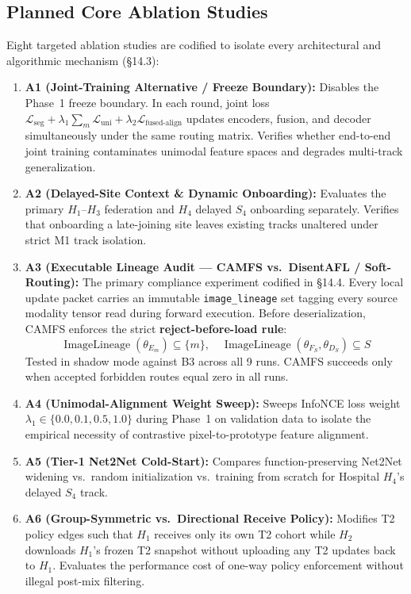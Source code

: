 \documentclass[10pt,a4paper]{article}
\begin{document}
\subsection{Planned Core Ablation Studies}
Eight targeted ablation studies are codified to isolate every architectural and algorithmic mechanism (\S14.3):
\begin{enumerate}[itemsep=1.5pt, topsep=1.5pt]
    \item \textbf{A1 (Joint-Training Alternative / Freeze Boundary):} Disables the Phase~1 freeze boundary. In each round, joint loss $\mathcal{L}_{\text{seg}} + \lambda_1 \sum_m \mathcal{L}_{\text{uni}} + \lambda_2 \mathcal{L}_{\text{fused-align}}$ updates encoders, fusion, and decoder simultaneously under the same routing matrix. Verifies whether end-to-end joint training contaminates unimodal feature spaces and degrades multi-track generalization.
    \item \textbf{A2 (Delayed-Site Context \& Dynamic Onboarding):} Evaluates the primary $H_1$–$H_3$ federation and $H_4$ delayed $S_4$ onboarding separately. Verifies that onboarding a late-joining site leaves existing tracks unaltered under strict M1 track isolation.
    \item \textbf{A3 (Executable Lineage Audit — CAMFS vs.\ DisentAFL / Soft-Routing):} The primary compliance experiment codified in \S14.4. Every local update packet carries an immutable \texttt{image\_lineage} set tagging every source modality tensor read during forward execution. Before deserialization, CAMFS enforces the strict \textbf{reject-before-load rule}:
    \begin{equation}
    \operatorname{ImageLineage}(\theta_{E_m}) \subseteq \{m\}, \quad \operatorname{ImageLineage}(\theta_{F_S}, \theta_{D_S}) \subseteq S
    \end{equation}
    Tested in shadow mode against B3 across all 9 runs. CAMFS succeeds only when accepted forbidden routes equal zero in all runs.
    \item \textbf{A4 (Unimodal-Alignment Weight Sweep):} Sweeps InfoNCE loss weight $\lambda_1 \in \{0.0, 0.1, 0.5, 1.0\}$ during Phase~1 on validation data to isolate the empirical necessity of contrastive pixel-to-prototype feature alignment.
    \item \textbf{A5 (Tier-1 Net2Net Cold-Start):} Compares function-preserving Net2Net widening vs.\ random initialization vs.\ training from scratch for Hospital $H_4$'s delayed $S_4$ track.
    \item \textbf{A6 (Group-Symmetric vs.\ Directional Receive Policy):} Modifies T2 policy edges such that $H_1$ receives only its own T2 cohort while $H_2$ downloads $H_1$'s frozen T2 snapshot without uploading any T2 updates back to $H_1$. Evaluates the performance cost of one-way policy enforcement without illegal post-mix filtering.

\end{enumerate}
\end{document}
